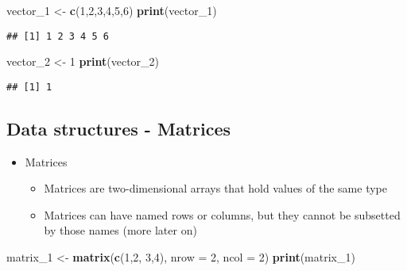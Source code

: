 \documentclass[]{article}
\newenvironment{Shaded}{\begin{snugshade}}{\end{snugshade}}
\newcommand{\KeywordTok}[1]{\textcolor[rgb]{0.13,0.29,0.53}{\textbf{#1}}}
\newcommand{\DataTypeTok}[1]{\textcolor[rgb]{0.13,0.29,0.53}{#1}}
\newcommand{\DecValTok}[1]{\textcolor[rgb]{0.00,0.00,0.81}{#1}}
\newcommand{\StringTok}[1]{\textcolor[rgb]{0.31,0.60,0.02}{#1}}
\newcommand{\NormalTok}[1]{#1}
\providecommand{\tightlist}{%
  \setlength{\itemsep}{0pt}\setlength{\parskip}{0pt}}
\begin{document}
\begin{Shaded}
\begin{Highlighting}[]
\NormalTok{vector_}\DecValTok{1}\NormalTok{ <-}\StringTok{ }\KeywordTok{c}\NormalTok{(}\DecValTok{1}\NormalTok{,}\DecValTok{2}\NormalTok{,}\DecValTok{3}\NormalTok{,}\DecValTok{4}\NormalTok{,}\DecValTok{5}\NormalTok{,}\DecValTok{6}\NormalTok{)}
\KeywordTok{print}\NormalTok{(vector_}\DecValTok{1}\NormalTok{)}
\end{Highlighting}
\end{Shaded}

\begin{verbatim}
## [1] 1 2 3 4 5 6
\end{verbatim}

\begin{Shaded}
\begin{Highlighting}[]
\NormalTok{vector_}\DecValTok{2}\NormalTok{ <-}\StringTok{ }\DecValTok{1}
\KeywordTok{print}\NormalTok{(vector_}\DecValTok{2}\NormalTok{)}
\end{Highlighting}
\end{Shaded}

\begin{verbatim}
## [1] 1
\end{verbatim}

\subsection{Data structures -
Matrices}\label{data-structures---matrices}

\begin{itemize}
\tightlist
\item
  Matrices

  \begin{itemize}
  \tightlist
  \item
    Matrices are two-dimensional arrays that hold values of the same
    type
  \item
    Matrices can have named rows or columns, but they cannot be
    subsetted by those names (more later on)
  \end{itemize}
\end{itemize}

\begin{Shaded}
\begin{Highlighting}[]
\NormalTok{matrix_}\DecValTok{1}\NormalTok{ <-}\StringTok{ }\KeywordTok{matrix}\NormalTok{(}\KeywordTok{c}\NormalTok{(}\DecValTok{1}\NormalTok{,}\DecValTok{2}\NormalTok{, }\DecValTok{3}\NormalTok{,}\DecValTok{4}\NormalTok{), }\DataTypeTok{nrow =} \DecValTok{2}\NormalTok{, }\DataTypeTok{ncol =} \DecValTok{2}\NormalTok{)}
\KeywordTok{print}\NormalTok{(matrix_}\DecValTok{1}\NormalTok{)}
\end{Highlighting}
\end{Shaded}
\end{document}
